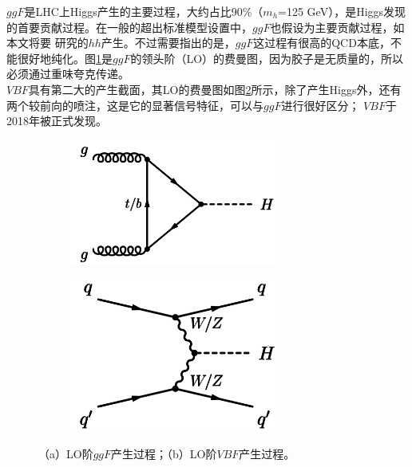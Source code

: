 $ggF$是LHC上Higgs产生的主要过程，大约占比90\%（$m_h$=125 GeV），是Higgs发现的首要贡献过程。在一般的超出标准模型设置中，$ggF$也假设为主要贡献过程，如本文将要
研究的$hh$产生。不过需要指出的是，$ggF$这过程有很高的QCD本底，不能很好地纯化。图\ref{fig:diagram_ggF}是$ggF$的领头阶（LO）的费曼图，因为胶子是无质量的，所以必须通过重味夸克传递。\\
$VBF$具有第二大的产生截面，其LO的费曼图如图\ref{fig:diagram_VBF}所示，除了产生Higgs外，还有两个较前向的喷注，这是它的显著信号特征，可以与$ggF$进行很好区分；
$VBF$于2018年被正式发现\cite{ATLAS:2018doi}。
\begin{figure}[h]
\centering
 \begin{subfigure}[b]{0.45\textwidth}
  \includegraphics[width=0.75\textwidth]{fig/diagram_ggF.png}
  \caption{}
  \label{fig:diagram_ggF}
 \end{subfigure}
 \begin{subfigure}[b]{0.45\textwidth}
  \includegraphics[width=0.75\textwidth]{fig/diagram_VBF.png}
  \caption{}
  \label{fig:diagram_VBF}
 \end{subfigure}
\caption{（a）LO阶$ggF$产生过程；（b）LO阶$VBF$产生过程。}
\label{fig:ggF_VBF}
\end{figure}
